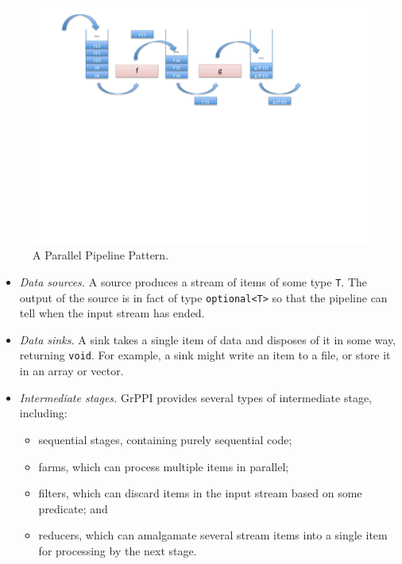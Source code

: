 \begin{figure}[!ht]
\includegraphics[width=12cm]{figures/pipeline.pdf}

\caption{A Parallel Pipeline Pattern.}
\label{pipeline1}
\end{figure}

\begin{itemize}
\item \emph{Data sources.}  A source produces a stream of items of some type \verb|T|.
The output of the source is in fact of type \verb|optional<T>| so
that the pipeline can tell when the input stream has
ended.


\item \emph{Data sinks.}
A sink takes a single item of data and disposes of it in some way, returning \verb|void|.
For example, a sink might write an item to a file, or store it in an array or vector.

\item \emph{Intermediate stages.} GrPPI provides several types of intermediate stage, including:
\begin{itemize}
\item sequential stages, containing purely sequential code;
\item farms, which can process multiple items in parallel;
\item filters, which can discard items in the input stream based on some predicate; and
\item reducers, which can amalgamate several stream items into a single item for processing by the next stage.
\end{itemize}
\end{itemize}

